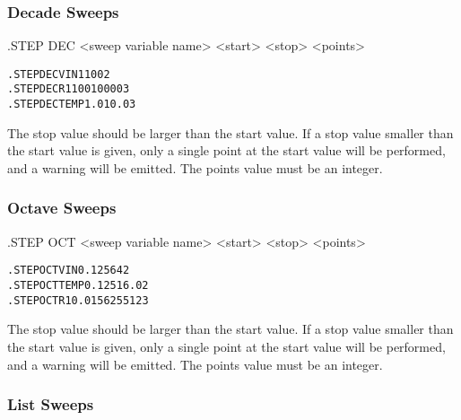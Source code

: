 \subsubsection{Decade Sweeps}
 

\begin{Command}

\format
.STEP DEC <sweep variable name> <start> <stop> <points>

\examples

\begin{alltt}
.STEP DEC VIN 1 100 2
.STEP DEC R1 100 10000 3 
.STEP DEC TEMP 1.0 10.0 3
\end{alltt}

\comments
The stop value should be larger than the start value.  If a stop value
smaller than the start value is given, only a single point at the
start value will be performed, and a warning will be emitted.  The
points value must be an integer.

\end{Command}

\subsubsection{Octave Sweeps}
 

\begin{Command}

\format
.STEP OCT <sweep variable name> <start> <stop> <points>

\examples

\begin{alltt}
.STEP OCT VIN 0.125 64 2 
.STEP OCT TEMP 0.125 16.0 2 
.STEP OCT R1 0.015625 512 3
\end{alltt}

\comments
The stop value should be larger than the start value.  If a stop value
smaller than the start value is given, only a single point at the
start value will be performed, and a warning will be emitted.  The
points value must be an integer.

\end{Command}

\subsubsection{List Sweeps}
 


